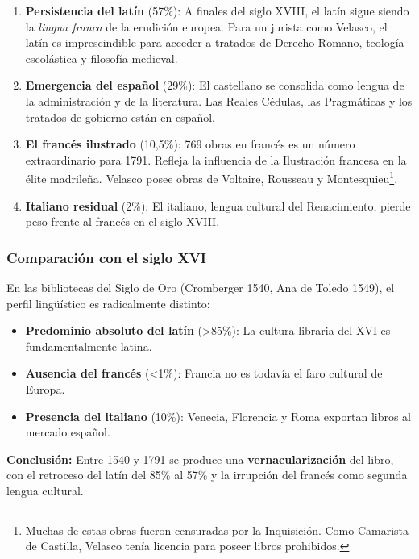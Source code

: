 \documentclass[12pt,a4paper]{article}
\begin{document}
\begin{enumerate}
\item \textbf{Persistencia del latín} (57\%): A finales del siglo XVIII, el latín sigue siendo la \textit{lingua franca} de la erudición europea. Para un jurista como Velasco, el latín es imprescindible para acceder a tratados de Derecho Romano, teología escolástica y filosofía medieval.

\item \textbf{Emergencia del español} (29\%): El castellano se consolida como lengua de la administración y de la literatura. Las Reales Cédulas, las Pragmáticas y los tratados de gobierno están en español.

\item \textbf{El francés ilustrado} (10,5\%): 769 obras en francés es un número extraordinario para 1791. Refleja la influencia de la Ilustración francesa en la élite madrileña. Velasco posee obras de Voltaire, Rousseau y Montesquieu\footnote{Muchas de estas obras fueron censuradas por la Inquisición. Como Camarista de Castilla, Velasco tenía licencia para poseer libros prohibidos.}.

\item \textbf{Italiano residual} (2\%): El italiano, lengua cultural del Renacimiento, pierde peso frente al francés en el siglo XVIII.
\end{enumerate}

\subsubsection{Comparación con el siglo XVI}

En las bibliotecas del Siglo de Oro (Cromberger 1540, Ana de Toledo 1549), el perfil lingüístico es radicalmente distinto:

\begin{itemize}
\item \textbf{Predominio absoluto del latín} (>85\%): La cultura libraria del XVI es fundamentalmente latina.

\item \textbf{Ausencia del francés} (<1\%): Francia no es todavía el faro cultural de Europa.

\item \textbf{Presencia del italiano} (10\%): Venecia, Florencia y Roma exportan libros al mercado español.
\end{itemize}

\textbf{Conclusión:} Entre 1540 y 1791 se produce una \textbf{vernacularización} del libro, con el retroceso del latín del 85\% al 57\% y la irrupción del francés como segunda lengua cultural.
\end{document}
